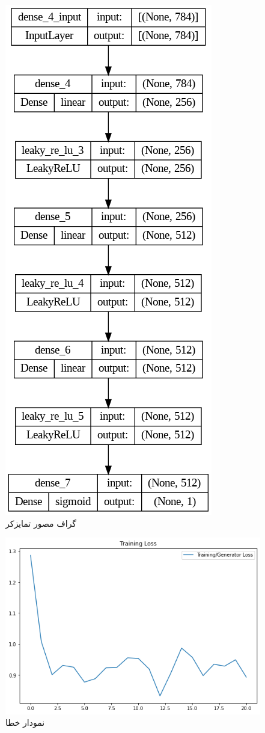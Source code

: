 \documentclass{article}
\begin{document}
\begin{figure}[!h]
    \centering\includegraphics[scale=.55]{./dis-2}
    \caption{گراف مصور تمایزکر}\label{fig.34}
\end{figure}

\begin{figure}[!h]
    \centering\includegraphics[scale=.55]{./loss-1}
    \caption{نمودار خطا}\label{fig.35}
\end{figure}
\end{document}
